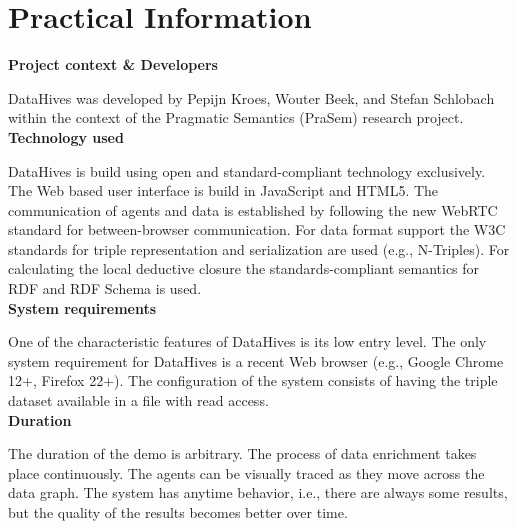\documentclass{article}
\begin{document}

\section{Practical Information}

\noindent \textbf{Project context \& Developers}

\noindent DataHives was developed by Pepijn Kroes, Wouter Beek, and
Stefan Schlobach within the context of the Pragmatic Semantics (PraSem)
research project.\\

\noindent \textbf{Technology used}

\noindent DataHives is build using open and standard-compliant
technology exclusively.
The Web based user interface is build in JavaScript and HTML5.
The communication of agents and data is established by following the
new WebRTC standard for between-browser communication.
For data format support the W3C standards for triple representation and
serialization are used (e.g., N-Triples).
For calculating the local deductive closure the standards-compliant
semantics for RDF and RDF Schema is used.\\

\noindent \textbf{System requirements}

\noindent One of the characteristic features of DataHives is its
low entry level.
The only system requirement for DataHives is a recent Web browser
(e.g., Google Chrome 12+, Firefox 22+).
The configuration of the system consists of having the triple dataset
available in a file with read access.\\

\noindent \textbf{Duration}

\noindent The duration of the demo is arbitrary.
The process of data enrichment takes place continuously.
The agents can be visually traced as they move across the data graph.
The system has anytime behavior, i.e., there are always some results,
but the quality of the results becomes better over time.
\end{document}
